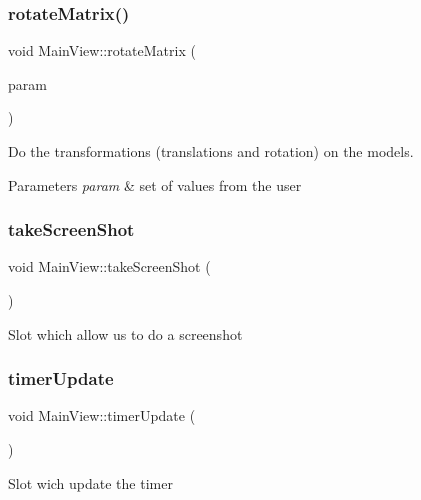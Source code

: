 \subsubsection{\texorpdfstring{rotate\+Matrix()}{rotateMatrix()}}
{\footnotesize\ttfamily void Main\+View\+::rotate\+Matrix (\begin{DoxyParamCaption}\item[{\hyperlink{structset_of_values}{set\+Of\+Values}}]{param }\end{DoxyParamCaption})}



Do the transformations (translations and rotation) on the models. 


\begin{DoxyParams}{Parameters}
{\em param} & set of values from the user \\
\hline
\end{DoxyParams}
\hypertarget{class_main_view_a8e1549cbc6edb92d9eedfeae3976f161}{}\label{class_main_view_a8e1549cbc6edb92d9eedfeae3976f161} 
\subsubsection{\texorpdfstring{take\+Screen\+Shot}{takeScreenShot}}
{\footnotesize\ttfamily void Main\+View\+::take\+Screen\+Shot (\begin{DoxyParamCaption}{ }\end{DoxyParamCaption})\hspace{0.3cm}{\ttfamily [slot]}}

Slot which allow us to do a screenshot \hypertarget{class_main_view_a456d4761f9c8dcf828ea4fcfac37c21a}{}\label{class_main_view_a456d4761f9c8dcf828ea4fcfac37c21a} 
\subsubsection{\texorpdfstring{timer\+Update}{timerUpdate}}
{\footnotesize\ttfamily void Main\+View\+::timer\+Update (\begin{DoxyParamCaption}{ }\end{DoxyParamCaption})\hspace{0.3cm}{\ttfamily [slot]}}

Slot wich update the timer \hypertarget{class_main_view_afbc772adcee43265ce364ff656c19500}{}\label{class_main_view_afbc772adcee43265ce364ff656c19500} 
